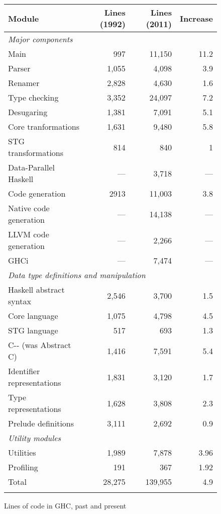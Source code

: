 \documentclass{article}
\begin{document}
\begin{figure}
\begin{tabular}{|lrrr|}
\hline
Module & Lines (1992) & Lines (2011) & Increase \\

\hline
\multicolumn{4}{|l|}{\emph{Major components}} \\
Main    & 997 & 11,150 & 11.2 \\
Parser  & 1,055 & 4,098 & 3.9 \\
Renamer & 2,828 & 4,630 & 1.6 \\
Type checking & 3,352 & 24,097 & 7.2 \\
Desugaring & 1,381 & 7,091 & 5.1 \\
Core tranformations & 1,631 & 9,480 & 5.8 \\
STG transformations & 814 & 840 & 1 \\
Data-Parallel Haskell & --- & 3,718 & --- \\
Code generation & 2913 & 11,003 & 3.8 \\
Native code generation & --- & 14,138 & --- \\
LLVM code generation & --- & 2,266 & --- \\
GHCi & --- & 7,474 & --- \\

\hline
\multicolumn{4}{|l|}{\emph{Data type definitions and manipulation}} \\
Haskell abstract syntax & 2,546 & 3,700 & 1.5 \\
Core language & 1,075 & 4,798 & 4.5 \\
STG language & 517 & 693 & 1.3 \\
C{-}{-} (was Abstract C)  & 1,416 & 7,591 & 5.4 \\
Identifier representations & 1,831 & 3,120 & 1.7 \\
Type representations & 1,628 & 3,808 & 2.3 \\
Prelude definitions & 3,111 & 2,692 & 0.9 \\

\hline
\multicolumn{4}{|l|}{\emph{Utility modules}} \\
Utilities & 1,989 & 7,878 & 3.96 \\
Profiling & 191 & 367 & 1.92 \\
\hline
Total  & 28,275 & 139,955 & 4.9 \\
\hline
\label{t:lines}
\end{tabular}
\caption{Lines of code in GHC, past and present}
\end{figure}
\end{document}
